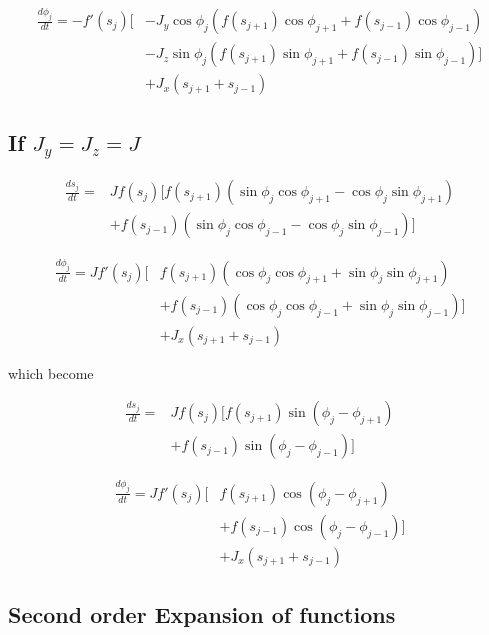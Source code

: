 \documentclass{article}
\begin{document}
\begin{align*}
    \frac{d\phi_j}{dt} = -f'(s_j)[&-J_y\cos\phi_j(f(s_{j+1})\cos\phi_{j+1} + f(s_{j-1})\cos\phi_{j-1}) \\
                                  &-J_z\sin\phi_j(f(s_{j+1})\sin\phi_{j+1} + f(s_{j-1})\sin\phi_{j-1})] \\
                                  &+J_x(s_{j+1} + s_{j-1})
\end{align*}


\subsection{If $J_y = J_z = J$}

\begin{align*}
    \frac{ds_j}{dt} = &Jf(s_j)[f(s_{j+1}) (\sin\phi_j\cos\phi_{j+1} - \cos\phi_j\sin\phi_{j+1})\\
                      &+f(s_{j-1})(\sin\phi_j\cos\phi_{j-1} - \cos\phi_j\sin\phi_{j-1})]
\end{align*}

\begin{align*}
    \frac{d\phi_j}{dt} = Jf'(s_j)[&f(s_{j+1})(\cos\phi_j\cos\phi_{j+1} + \sin\phi_j\sin\phi_{j+1}) \\
                                  &+f(s_{j-1})(\cos\phi_j\cos\phi_{j-1} + \sin\phi_j\sin\phi_{j-1})] \\
                                  &+J_x(s_{j+1} + s_{j-1})
\end{align*}


which become

\begin{align*}
    \frac{ds_j}{dt} = &Jf(s_j)[f(s_{j+1})\sin(\phi_j - \phi_{j+1})\\
                      &+f(s_{j-1})\sin(\phi_j - \phi_{j-1})]
\end{align*}

\begin{align*}
    \frac{d\phi_j}{dt} = Jf'(s_j)[&f(s_{j+1})\cos(\phi_j - \phi_{j+1}) \\
                                  &+f(s_{j-1})\cos(\phi_j - \phi_{j-1})] \\
                                  &+J_x(s_{j+1} + s_{j-1})
\end{align*}

\subsection{Second order Expansion of functions}
\end{document}

